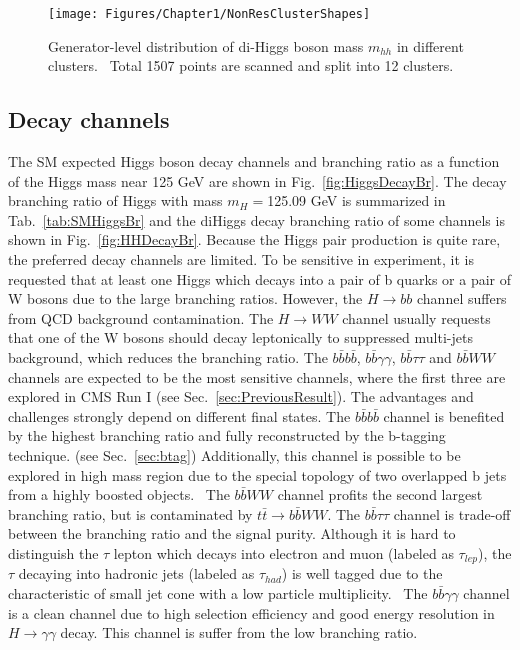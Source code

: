 
\begin{figure}[h]
  \centering
  \texttt{[image: Figures/Chapter1/NonResClusterShapes]}
  \caption{Generator-level distribution of di-Higgs boson mass $m_{hh}$ in different clusters.~\cite{1507.02245} Total 1507 points are scanned and split into 12 clusters.}
  \label{fig:NonResClusterShapes}
\end{figure}

\clearpage

\subsection{Decay channels}

The SM expected Higgs boson decay channels and branching ratio as a function of the Higgs mass near 125 GeV are shown in Fig.~\ref{fig:HiggsDecayBr}.
The decay branching ratio of Higgs with mass $m_{H}=$125.09 GeV is summarized in Tab.~\ref{tab:SMHiggsBr} and the diHiggs decay branching ratio of some channels is shown in Fig.~\ref{fig:HHDecayBr}.
Because the Higgs pair production is quite rare, the preferred decay channels are limited.
To be sensitive in experiment, it is requested that at least one Higgs which decays into a pair of b quarks or a pair of W bosons due to the large branching ratios.
However, the $H \rightarrow bb$ channel suffers from QCD background contamination.
The $H \rightarrow WW$ channel usually requests that one of the W bosons should decay leptonically to suppressed multi-jets background, which reduces the branching ratio.
The $b\bar{b} b\bar{b}$, $b\bar{b}\gamma\gamma$, $b\bar{b}\tau\tau$ and $b\bar{b} WW$ channels are expected to be the most sensitive channels, where the first three are explored in CMS Run I (see Sec.~\ref{sec:PreviousResult}).
The advantages and challenges strongly depend on different final states.
The $b\bar{b} b\bar{b}$ channel is benefited by the highest branching ratio and fully reconstructed by the b-tagging technique. (see Sec.~\ref{sec:btag})
Additionally, this channel is possible to be explored in high mass region due to the special topology of two overlapped b jets from a highly boosted objects.~\cite{CMS-PAS-BTV-13-001}
The $b\bar{b} WW$ channel profits the second largest branching ratio, but is contaminated by $t\bar{t}\rightarrow b\bar{b} WW$.
The $b\bar{b}\tau\tau$ channel is trade-off between the branching ratio and the signal purity.
Although it is hard to distinguish the $\tau$ lepton which decays into electron and muon (labeled as $\tau_{lep}$), the $\tau$ decaying into hadronic jets (labeled as $\tau_{had}$) is well tagged due to the characteristic of small jet cone with a low particle multiplicity.~\cite{1510.07488}
The $b\bar{b}\gamma\gamma$ channel is a clean channel due to high selection efficiency and good energy resolution in $H \rightarrow \gamma\gamma$ decay. This channel is suffer from the low branching ratio.

